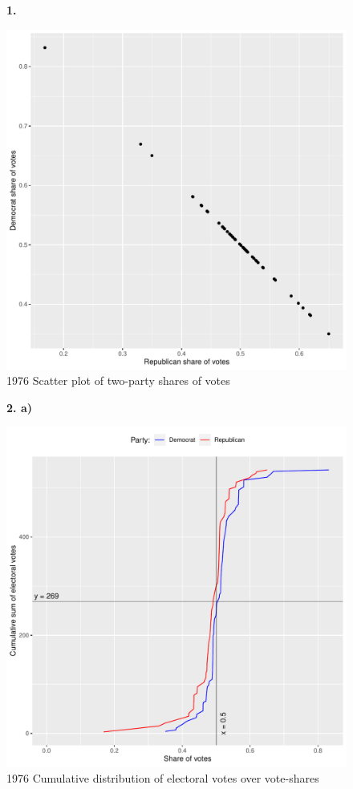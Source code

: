 \documentclass[12pt, letterpaper]{article}
\begin{document}
\begin{figure}[!ht]
\textbf{1.}\par\medskip
\caption*{1976 Scatter plot of two-party shares of votes}
\includegraphics[scale=0.9]{shares_1.pdf}
\end{figure}

\begin{figure}[!ht]
\textbf{2. a)}\par\medskip
\caption*{1976 Cumulative distribution of electoral votes over vote-shares}
\includegraphics[scale=0.9]{cdf_2a.pdf}
\end{figure}
\end{document}
